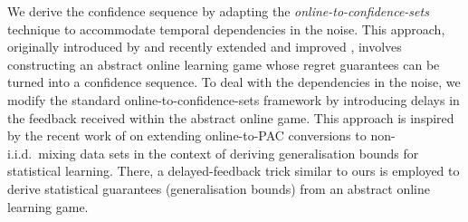 We derive the confidence sequence by adapting the \emph{online-to-confidence-sets} technique to accommodate temporal 
dependencies in the noise. This approach, originally introduced by \cite{abbasi2011improved} and recently extended and 
improved \citep{jun2017scalable, lee2024improved, clerico2025confidence}, involves 
constructing an abstract online learning game whose regret guarantees can be turned into a confidence sequence. To deal 
with the dependencies in the noise, we modify the standard online-to-confidence-sets framework by introducing delays in 
the feedback received within the abstract online game. This approach is inspired by the recent work of 
\cite{abeles2024generalization} on extending online-to-PAC conversions to non-i.i.d.~mixing data sets in the context of 
deriving generalisation bounds for statistical learning. There, a  delayed-feedback trick similar to ours is employed to 
derive statistical guarantees (generalisation bounds) from an abstract online learning game. 

